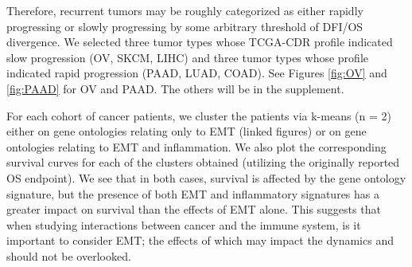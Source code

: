\documentclass[11pt]{article}
\begin{document}
Therefore, recurrent tumors may be roughly categorized as either rapidly progressing or slowly progressing by some arbitrary threshold of DFI/OS divergence.
We selected three tumor types whose TCGA-CDR profile indicated slow progression (OV, SKCM, LIHC) and three tumor types whose profile indicated rapid progression (PAAD, LUAD, COAD).
See Figures \ref{fig:OV} and \ref{fig:PAAD} for OV and PAAD. The others will be in the supplement.
\par
For each cohort of cancer patients, we cluster the patients via k-means (n = 2) either on gene ontologies relating only to EMT (linked figures) or on gene ontologies relating to EMT and inflammation.  We also plot the corresponding survival curves for each of the clusters obtained (utilizing the originally reported OS endpoint). We see that in both cases, survival is affected by the gene ontology signature, but the presence of both EMT and inflammatory signatures has a greater impact on survival than the effects of EMT alone. This suggests that when studying interactions between cancer and the immune system, is it important to consider EMT; the effects of which may impact the dynamics and should not be overlooked. 

\par
\end{document}
